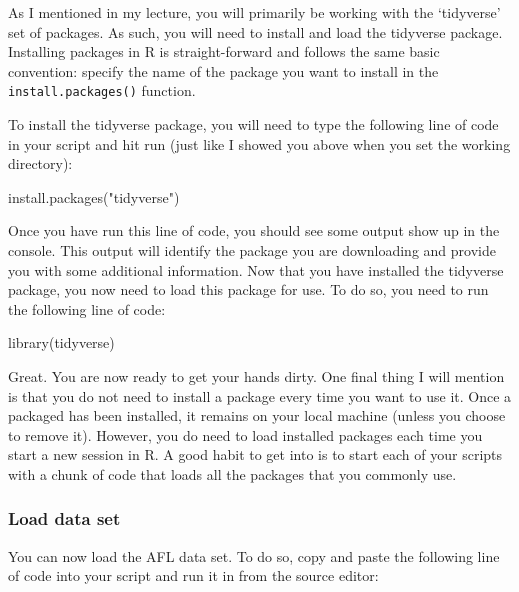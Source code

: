 \documentclass[
]{article}
\newenvironment{Shaded}{\begin{snugshade}}{\end{snugshade}}
\newcommand{\FunctionTok}[1]{\textcolor[rgb]{0.00,0.00,0.00}{#1}}
\newcommand{\NormalTok}[1]{#1}
\newcommand{\StringTok}[1]{\textcolor[rgb]{0.31,0.60,0.02}{#1}}
\begin{document}
As I mentioned in my lecture, you will primarily be working with the
`tidyverse' set of packages. As such, you will need to install and load
the tidyverse package. Installing packages in R is straight-forward and
follows the same basic convention: specify the name of the package you
want to install in the \texttt{install.packages()} function.

To install the tidyverse package, you will need to type the following
line of code in your script and hit run (just like I showed you above
when you set the working directory):

\begin{Shaded}
\begin{Highlighting}[]
\FunctionTok{install.packages}\NormalTok{(}\StringTok{"tidyverse"}\NormalTok{)}
\end{Highlighting}
\end{Shaded}

Once you have run this line of code, you should see some output show up
in the console. This output will identify the package you are
downloading and provide you with some additional information. Now that
you have installed the tidyverse package, you now need to load this
package for use. To do so, you need to run the following line of code:

\begin{Shaded}
\begin{Highlighting}[]
\FunctionTok{library}\NormalTok{(tidyverse)}
\end{Highlighting}
\end{Shaded}

Great. You are now ready to get your hands dirty. One final thing I will
mention is that you do not need to install a package every time you want
to use it. Once a packaged has been installed, it remains on your local
machine (unless you choose to remove it). However, you do need to load
installed packages each time you start a new session in R. A good habit
to get into is to start each of your scripts with a chunk of code that
loads all the packages that you commonly use.

\hypertarget{load-data-set}{%
\subsubsection{Load data set}\label{load-data-set}}

You can now load the AFL data set. To do so, copy and paste the
following line of code into your script and run it in from the source
editor:
\end{document}
